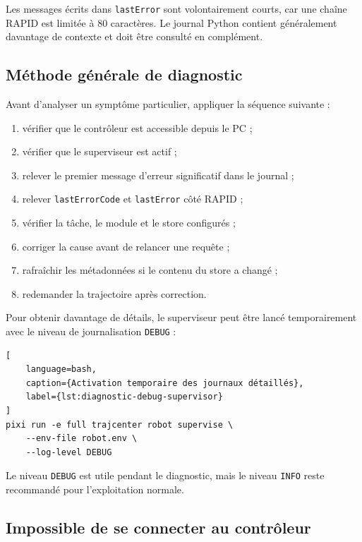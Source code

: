 \documentclass{rapportENSAM}
\begin{document}
Les messages écrits dans \texttt{lastError} sont volontairement courts, car
une chaîne RAPID est limitée à 80 caractères. Le journal Python contient
généralement davantage de contexte et doit être consulté en complément.

\subsection{Méthode générale de diagnostic}
\label{subsec:diagnostic-method}

Avant d'analyser un symptôme particulier, appliquer la séquence suivante :

\begin{enumerate}
    \item vérifier que le contrôleur est accessible depuis le PC ;
    \item vérifier que le superviseur est actif ;
    \item relever le premier message d'erreur significatif dans le journal ;
    \item relever \texttt{lastErrorCode} et \texttt{lastError} côté RAPID ;
    \item vérifier la tâche, le module et le store configurés ;
    \item corriger la cause avant de relancer une requête ;
    \item rafraîchir les métadonnées si le contenu du store a changé ;
    \item redemander la trajectoire après correction.
\end{enumerate}

Pour obtenir davantage de détails, le superviseur peut être lancé
temporairement avec le niveau de journalisation \texttt{DEBUG} :

\begin{lstlisting}[
    language=bash,
    caption={Activation temporaire des journaux détaillés},
    label={lst:diagnostic-debug-supervisor}
]
pixi run -e full trajcenter robot supervise \
    --env-file robot.env \
    --log-level DEBUG
\end{lstlisting}

Le niveau \texttt{DEBUG} est utile pendant le diagnostic, mais le niveau
\texttt{INFO} reste recommandé pour l'exploitation normale.


\subsection{Impossible de se connecter au contrôleur}
\label{subsec:diagnostic-controller-connection}
\end{document}

